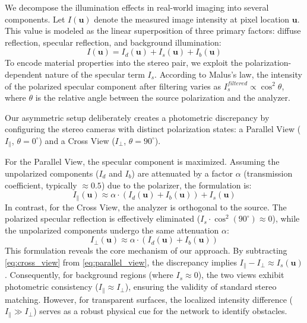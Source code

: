 \documentclass[letterpaper, 10 pt, conference]{ieeeconf}  %
\begin{document}
We decompose the illumination effects in real-world imaging into several components. Let $I(\mathbf{u})$ denote the measured image intensity at pixel location $\mathbf{u}$. This value is modeled as the linear superposition of three primary factors: diffuse reflection, specular reflection, and background illumination:
\begin{equation}
    I(\mathbf{u}) = I_{d}(\mathbf{u}) + I_{s}(\mathbf{u}) + I_{b}(\mathbf{u})
\end{equation}
To encode material properties into the stereo pair, we exploit the polarization-dependent nature of the specular term $I_s$. According to Malus's law, the intensity of the polarized specular component after filtering varies as $I_{s}^{filtered} \propto \cos^2\theta$, where $\theta$ is the relative angle between the source polarization and the analyzer.

Our asymmetric setup deliberately creates a photometric discrepancy by configuring the stereo cameras with distinct polarization states: a Parallel View ($I_{\parallel}$, $\theta=0^\circ$) and a Cross View ($I_{\perp}$, $\theta=90^\circ$).

For the Parallel View, the specular component is maximized. Assuming the unpolarized components ($I_d$ and $I_b$) are attenuated by a factor $\alpha$ (transmission coefficient, typically $\approx 0.5$) due to the polarizer, the formulation is:
\begin{equation}
    I_{\parallel}(\mathbf{u}) \approx \alpha \cdot (I_{d}(\mathbf{u}) + I_{b}(\mathbf{u})) + I_{s}(\mathbf{u})
    \label{eq:parallel_view}
\end{equation}
In contrast, for the Cross View, the analyzer is orthogonal to the source. The polarized specular reflection is effectively eliminated ($I_s \cdot \cos^2(90^\circ) \approx 0$), while the unpolarized components undergo the same attenuation $\alpha$:
\begin{equation}
    I_{\perp}(\mathbf{u}) \approx \alpha \cdot (I_{d}(\mathbf{u}) + I_{b}(\mathbf{u}))
    \label{eq:cross_view}
\end{equation}
This formulation reveals the core mechanism of our approach. By subtracting \cref{eq:cross_view} from \cref{eq:parallel_view}, the discrepancy implies $I_{\parallel} - I_{\perp} \approx I_{s}(\mathbf{u})$. Consequently, for background regions (where $I_s \approx 0$), the two views exhibit photometric consistency ($I_{\parallel} \approx I_{\perp}$), ensuring the validity of standard stereo matching. However, for transparent surfaces, the localized intensity difference ($I_{\parallel} \gg I_{\perp}$) serves as a robust physical cue for the network to identify obstacles.
\end{document}
